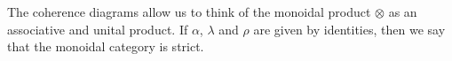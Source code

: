 \documentclass[../thesis.tex]{subfiles}
\begin{document}
\begin{definition}
\begin{center}
{
                }
            \end{center}
        \end{definition}

        The coherence diagrams allow us to think of the monoidal product $\otimes$ as an associative and unital product. If $\alpha$, $\lambda$ and $\rho$ are given by identities, then we say that the monoidal category is strict.
\end{document}

